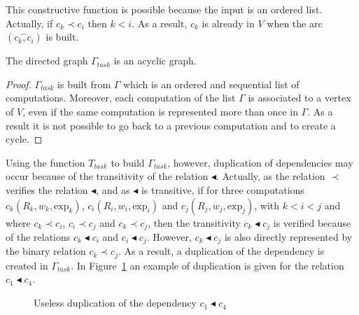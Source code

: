 This constructive function is possible because the input is an ordered list. Actually, if $c_k\prec c_i$ then $k<i$. As a result, $c_k$ is already in $V$ when the arc $(\overset{\frown}{c_k,c_i})$ is built. 

\begin{myprop}
The directed graph $\Gamma_{task}$ is an acyclic graph.
\end{myprop}

\begin{proof}
$\Gamma_{task}$ is built from $\Gamma$ which is an ordered and sequential list of computations. Moreover, each computation of the list $\Gamma$ is associated to a vertex of $V$, even if the same computation is represented more than once in $\Gamma$. As a result it is not possible to go back to a previous computation and to create a cycle.
\end{proof}

Using the function $T_{task}$ to build $\Gamma_{task}$, however, duplication of dependencies may occur because of the transitivity of the relation $\blacktriangleleft$. Actually, as the relation $\prec$ verifies the relation $\blacktriangleleft$, and as $\blacktriangleleft$ is transitive, if for three computations $c_k(R_k,w_k,\text{exp}_k)$, $c_i(R_i,w_i,\text{exp}_i)$ and $c_j(R_j,w_j,\text{exp}_j)$, with $k<i<j$ and where $c_k \prec c_i$, $c_i \prec c_j$ and $c_k \prec c_j$, then the transitivity $c_k \blacktriangleleft c_j$ is verified because of the relations $c_k \blacktriangleleft c_i$ and $c_i \blacktriangleleft c_j$. However, $c_k \blacktriangleleft c_j$ is also directly represented by the binary relation $c_k \prec c_j$. As a result, a duplication of the dependency is created in $\Gamma_{task}$. In Figure~\ref{fig:duplication} an example of duplication is given for the relation $c_1 \blacktriangleleft c_4$.

\begin{figure}[h!]
\begin{center}
  \caption{Useless duplication of the dependency $c_1 \blacktriangleleft c_4$}
  \label{fig:duplication}
\end{center}
\end{figure}

